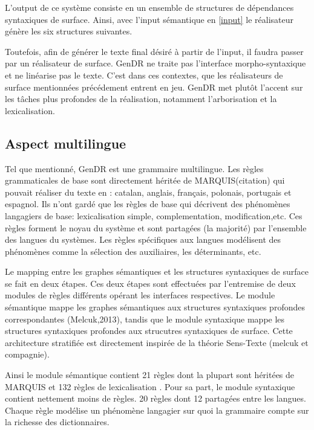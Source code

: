 L'output de ce système consiste en un ensemble de structures de dépendances syntaxiques de surface. Ainsi, avec l'input sémantique en \ref{input} le réalisateur génère les six structures suivantes. 

Toutefois, afin de générer le texte final désiré à partir de l'input, il faudra passer par un réalisateur de surface. GenDR ne traite pas l'interface morpho-syntaxique et ne linéarise pas le texte. C'est dans ces contextes, que les réalisateurs de surface mentionnées précédement entrent en jeu. GenDR met plutôt l'accent sur les tâches plus profondes de la réalisation, notamment l'arborisation et la lexicalisation.

\subsection{Aspect multilingue}
Tel que mentionné, GenDR est une grammaire multilingue. Les règles grammaticales de base sont directement héritée de MARQUIS(citation) qui pouvait réaliser du texte en : catalan, anglais, français, polonais, portugais et espagnol. Ils n'ont gardé que les règles de base qui décrivent des phénomènes langagiers de base: lexicalisation simple, complementation, modification,etc. Ces règles forment le noyau du système et sont partagées (la majorité) par l'ensemble des langues du systèmes. Les règles spécifiques aux langues modélisent des phénomènes comme la sélection des auxiliaires, les déterminants, etc.

Le mapping entre les graphes sémantiques et les structures syntaxiques de surface se fait en deux étapes. Ces deux étapes sont effectuées par l'entremise de deux modules de règles différents opérant les interfaces respectives. Le module sémantique mappe les graphes sémantiques aux structures syntaxiques profondes correspondantes (Melcuk,2013), tandis que le module syntaxique mappe les structures syntaxiques profondes aux strucutres syntaxiques de surface. Cette architecture stratifiée est directement inspirée de la théorie Sens-Texte (melcuk et compagnie).

Ainsi le module sémantique contient 21 règles dont la plupart sont héritées de MARQUIS et 132 règles de lexicalisation \citep{LambreyImplementationcollocationspour2017}. Pour sa part, le module syntaxique contient nettement moins de règles. 20 règles dont 12 partagées entre les langues. Chaque règle modélise un phénomène langagier sur quoi la grammaire compte sur la richesse des dictionnaires.

